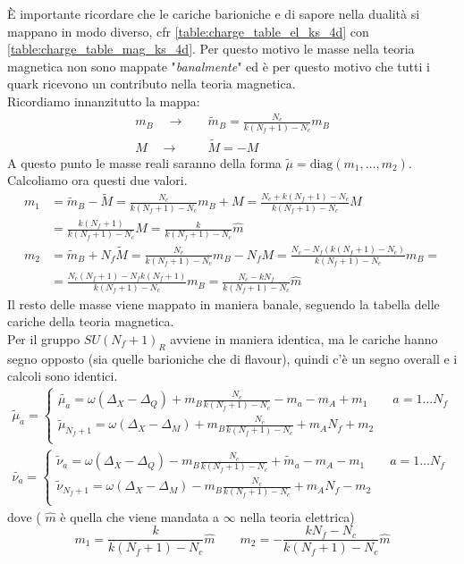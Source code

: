 \documentclass[a4paper,12pt]{article}
\begin{document}
È importante ricordare che le cariche barioniche e di sapore nella dualità si mappano in modo diverso, cfr \ref{table:charge_table_el_ks_4d} con \ref{table:charge_table_mag_ks_4d}.  Per questo motivo le masse nella teoria magnetica non sono mappate "\emph{banalmente}" ed è per questo motivo che tutti i quark ricevono un contributo nella teoria magnetica.
\\
Ricordiamo innanzitutto la mappa:
\begin{align*}
 m_B \quad \longrightarrow \quad & \tilde{m}_B = \frac{N_c}{k(N_f+1)-N_c} m_B \\  M \quad \longrightarrow \quad &\tilde{M} = - M
\end{align*}
A questo punto le masse reali saranno della forma $ \tilde{\mu} = \mbox{diag} ( m_1 , \dots , m_2)$. Calcoliamo ora questi due valori.
\begin{align*}
m_1 & = \tilde{m}_B - \tilde{M} = \frac{N_c}{k(N_f+1)-N_c} m_B + M = \frac{N_c + k (N_f+1) - N_c }{k(N_f+1)-N_c} M \\
& = \frac{k (N_f+1) }{k(N_f+1)-N_c} M = \frac{k}{k(N_f+1)-N_c} \hat{m} \\
m_2 & = \tilde{m}_B + N_f \tilde{M} = \frac{N_c}{k(N_f+1)-N_c} m_B -N_f M = \frac{N_c - N_f( k(N_f+1) - N_c)}{k(N_f+1)-N_c} m_B = \\
	& = \frac{N_c(N_f+1) - N_f k (N_f+1)}{k(N_f+1)-N_c} m_B  = \frac{N_c - k N_f}{k(N_f+1)-N_c} \hat{m}
\end{align*}
Il resto delle masse viene mappato in maniera banale, seguendo la tabella delle cariche della teoria magnetica. \\
Per il gruppo $SU(N_f+1)_R $ avviene in maniera identica, ma le cariche hanno segno opposto (sia quelle barioniche che di flavour), quindi c'è un segno overall e i calcoli sono identici.
\begin{align*}
	 \tilde \mu_a =
	 \begin{cases}
	  \tilde{ \mu_a} =  \omega ( \Delta_X - \Delta_Q ) + m_B \frac{N_c}{k(N_f +1) - N_c} - m_a  - m_A + m_1  \qquad a = 1 \dots N_f \\
	  \tilde \mu_{N_f+1} =  \omega ( \Delta_X - \Delta_M ) + m_B \frac{N_c}{k(N_f +1) - N_c} +  m_A N_f + m_2    \\
	 \end{cases}
	 \\
\tilde{ \nu_a} =
	\begin{cases}
	\tilde \nu_a = \omega ( \Delta_X - \Delta_Q ) - m_B \frac{N_c}{k(N_f +1) - N_c}  + \tilde m_a  - m_A - m_1 \qquad a = 1 \dots N_f\\
	 \tilde \nu_{N_f+1} = \omega ( \Delta_X - \Delta_M ) - m_B \frac{N_c}{k(N_f +1) - N_c}  +  m_A N_f- m_2 \\
	\end{cases}
\end{align*}
dove ( $\hat{m}$ è quella che viene mandata a $\infty$ nella teoria elettrica)
$$
 m_1  = \frac{k}{k(N_f+1) - N_c} \hat{m} \qquad m_2 = - \frac{k N_f - N_c}{k(N_f+1)-N_c} \hat{m}
$$
\end{document}
